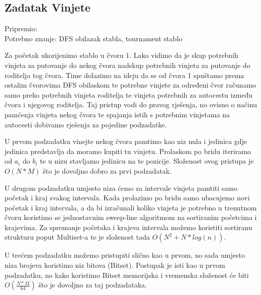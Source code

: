 \subsection*{Zadatak Vinjete}
\textsf{Pripremio: }\\
\textsf{Potrebno znanje: DFS obilazak stabla, tournament stablo}

Za početak ukorijenimo stablo u čvoru 1. Lako vidimo da je skup potrebnih vinjeta za putovanje do nekog čvora nadskup potrebnih vinjeta za putovanje do roditelja tog čvora. Time dolazimo na ideju da se od čvora 1 spuštamo prema ostalim čvorovima DFS obilaskom te potrebne vinjete za određeni čvor računamo samo preko potrebnih vinjeta roditelja te vinjeta potrebnih za autocestu između čvora i njegovog roditelja. Taj pristup vodi do pravog rješenja, no ovisno o načinu pamćenja vinjeta nekog čvora te spajanja istih s potrebnim vinjetama na autocesti dobivamo rješenja za pojedine podzadatke.

U prvom podzadatku vinejte nekog čvora pamtimo kao niz nula i jedinica gdje jedinica predstavlja da moramo kupiti tu vinjetu. Prolaskom po bridu iteriramo od $a_i$ do $b_i$ te u nizu stavljamo jedinicu na te pozicije. Složenost ovog pristupa je $O(N * M)$ što je dovoljno dobro za prvi podzadatak.

U drugom podzadatku umjesto niza ćemo za intervale vinjeta pamtiti samo početak i kraj svakog intervala. Kada prolazimo po bridu samo ubacujemo novi početak i kraj intervala, a da bi izračunali koliko vinjeta je potrebno u trenutnom čvoru koristimo se jednostavnim sweep-line algoritmom na sortiranim početcima i krajevima. Za spremanje početaka i krajeva intervala možemo koristiti sortiranu strukturu poput Multiset-a te je složenost tada $O(N^2 + N * log(n))$.

U trećem podzadatku možemo pristupiti slično kao u prvom, no sada umjesto niza brojeva koristimo niz bitova (Bitset). Postupak je isti kao u prvom podzadatku, no kako koristimo Bitset memorijska i vremenska složenost će biti $O(\frac{N * M}{64})$ što je dovoljno za taj podzadataka.

